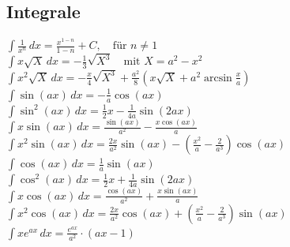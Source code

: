 \documentclass[12pt]{article}
\begin{document}
      \hfill
      \begin{minipage}[t]{0.48\textwidth}
         \subsection*{Integrale}

            \noindent
            \(\int \frac{1}{x^n} \, dx = \frac{x^{1-n}}{1-n} + C, \quad \text{für } n \neq 1\) \\[8pt]
            \(\int x \sqrt{X} \, dx = -\frac{1}{3} \sqrt{X^3} \quad \text{mit } X = a^2 - x^2\)\\[8pt]
            \(\int x^2 \sqrt{X} \, dx = -\frac{x}{4} \sqrt{X^3} + \frac{a^2}{8} \left( x \sqrt{X} + a^2 \arcsin \frac{x}{a} \right)\)\\[8pt]

            \(\int \sin(ax) \, dx = -\frac{1}{a} \cos(ax)\) \\[8pt]
            \(\int \sin^2(ax) \, dx = \frac{1}{2}x - \frac{1}{4a} \sin(2ax)\) \\[8pt]
            \(\int x \sin(ax) \, dx = \frac{\sin(ax)}{a^2} - \frac{x \cos(ax)}{a}\) \\[8pt]
            \(\int x^2 \sin(ax) \, dx = \frac{2x}{a^2} \sin(ax) - \left( \frac{x^2}{a} - \frac{2}{a^3} \right) \cos(ax)\) \\[8pt]

            \(\int \cos(ax) \, dx = \frac{1}{a} \sin(ax)\) \\[8pt]
            \(\int \cos^2(ax) \, dx = \frac{1}{2}x + \frac{1}{4a} \sin(2ax)\) \\[8pt]
            \(\int x \cos(ax) \, dx = \frac{\cos(ax)}{a^2} + \frac{x \sin(ax)}{a}\) \\[8pt]
            \(\int x^2 \cos(ax) \, dx = \frac{2x}{a^2} \cos(ax) + \left( \frac{x^2}{a} - \frac{2}{a^3} \right) \sin(ax)\) \\[8pt]

            \(\int x e^{a x} \, dx = \frac{e^{a x}}{a^2} \cdot (a x - 1)\)
      \end{minipage}

      \newpage
\end{document}
